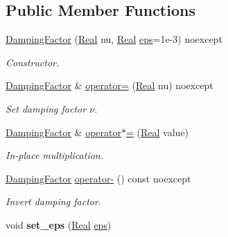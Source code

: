 \subsection*{Public Member Functions}
\begin{DoxyCompactItemize}
\item 
\hyperlink{classSpacy_1_1DampingFactor_a70e93ad9b0245cbc644d0f930d0cadc0}{Damping\-Factor} (\hyperlink{classSpacy_1_1Real}{Real} nu, \hyperlink{classSpacy_1_1Real}{Real} \hyperlink{classSpacy_1_1Mixin_1_1Eps_a812b99b0abc1d78a34b4114907f23f52}{eps}=1e-\/3) noexcept
\begin{DoxyCompactList}\small\item\em Constructor. \end{DoxyCompactList}\item 
\hyperlink{classSpacy_1_1DampingFactor}{Damping\-Factor} \& \hyperlink{classSpacy_1_1DampingFactor_ae28aa1372882e7cc94ff64e16835e7bd}{operator=} (\hyperlink{classSpacy_1_1Real}{Real} nu) noexcept
\begin{DoxyCompactList}\small\item\em Set damping factor $\nu$. \end{DoxyCompactList}\item 
\hypertarget{classSpacy_1_1DampingFactor_a58e54413ae9d5a78e90a7f99c58a127a}{\hyperlink{classSpacy_1_1DampingFactor}{Damping\-Factor} \& \hyperlink{classSpacy_1_1DampingFactor_a58e54413ae9d5a78e90a7f99c58a127a}{operator$\ast$=} (\hyperlink{classSpacy_1_1Real}{Real} value)}\label{classSpacy_1_1DampingFactor_a58e54413ae9d5a78e90a7f99c58a127a}

\begin{DoxyCompactList}\small\item\em In-\/place multiplication. \end{DoxyCompactList}\item 
\hypertarget{classSpacy_1_1DampingFactor_ad5f845e6bbf9f232e09aeea07ab4c32e}{\hyperlink{classSpacy_1_1DampingFactor}{Damping\-Factor} \hyperlink{classSpacy_1_1DampingFactor_ad5f845e6bbf9f232e09aeea07ab4c32e}{operator-\/} () const noexcept}\label{classSpacy_1_1DampingFactor_ad5f845e6bbf9f232e09aeea07ab4c32e}

\begin{DoxyCompactList}\small\item\em Invert damping factor. \end{DoxyCompactList}\item 
\hypertarget{classSpacy_1_1Mixin_1_1Eps_a818ab6dfab5e4eea583e1302bcc621f8}{void {\bfseries set\-\_\-eps} (\hyperlink{classSpacy_1_1Real}{Real} \hyperlink{classSpacy_1_1Mixin_1_1Eps_a812b99b0abc1d78a34b4114907f23f52}{eps})}\label{classSpacy_1_1Mixin_1_1Eps_a818ab6dfab5e4eea583e1302bcc621f8}


\end{DoxyCompactItemize}

